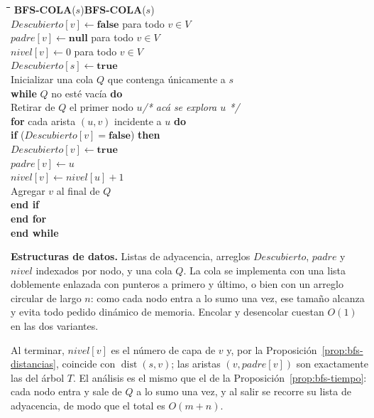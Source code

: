 \documentclass[12pt, spanish, oneside, openany]{book}
\newcommand{\pl}[1]{\makebox[1.6em][r]{\texttt{\footnotesize #1}}\hspace{0.9em}}
\newenvironment{pseudo}[1]{%
  \begin{center}%
  \begin{mdframed}[style=pseudobox]%
  \small
  \begin{tabbing}%
  \hspace{2.5em}\=\hspace{1.5em}\=\hspace{1.5em}\=\hspace{1.5em}\=\hspace{1.5em}\=\kill
  \def\pseudotitulo{#1}\ifx\pseudotitulo\empty\else#1\\[3pt]\fi}%
  {\end{tabbing}\end{mdframed}\end{center}}
\newenvironment{estructuras}%
  {\begin{center}\begin{minipage}{0.93\textwidth}\begin{mdframed}[style=estrbox]%
   \small\textbf{Estructuras de datos.}\;}%
  {\end{mdframed}\end{minipage}\end{center}}
\theoremstyle{uprightplain}
\theoremstyle{definition}
\theoremstyle{remark}
\theoremstyle{definition}
\begin{document}
\begin{pseudo}{\textbf{BFS-COLA}($s$)}
\pl{1}\> $\mathit{Descubierto}[v] \leftarrow \textbf{false}$ para todo $v\in V$\\
\pl{2}\> $\mathit{padre}[v] \leftarrow \textbf{null}$ para todo $v\in V$\\
\pl{3}\> $\mathit{nivel}[v] \leftarrow 0$ para todo $v\in V$\\
\pl{4}\> $\mathit{Descubierto}[s] \leftarrow \textbf{true}$\\
\pl{5}\> Inicializar una cola $Q$ que contenga únicamente a $s$\\
\pl{6}\> \textbf{while} $Q$ no esté vacía \textbf{do}\\
\pl{7}\>\> Retirar de $Q$ el primer nodo $u$\qquad \textit{/* acá se explora $u$ */}\\
\pl{8}\>\> \textbf{for} cada arista $(u,v)$ incidente a $u$ \textbf{do}\\
\pl{9}\>\>\> \textbf{if} ($\mathit{Descubierto}[v] = \textbf{false}$) \textbf{then}\\
\pl{10}\>\>\>\> $\mathit{Descubierto}[v] \leftarrow \textbf{true}$\\
\pl{11}\>\>\>\> $\mathit{padre}[v] \leftarrow u$\\
\pl{12}\>\>\>\> $\mathit{nivel}[v] \leftarrow \mathit{nivel}[u]+1$\\
\pl{13}\>\>\>\> Agregar $v$ al final de $Q$\\
\pl{14}\>\>\> \textbf{end if}\\
\pl{15}\>\> \textbf{end for}\\
\pl{16}\> \textbf{end while}
\end{pseudo}

\begin{estructuras}
Listas de adyacencia, arreglos $\mathit{Descubierto}$, $\mathit{padre}$
y $\mathit{nivel}$ indexados por nodo, y una cola $Q$. La cola se
implementa con una lista doblemente enlazada con punteros a primero y último, o
bien con un arreglo circular de largo $n$: como cada nodo entra a lo
sumo una vez, ese tamaño alcanza y evita todo pedido dinámico de memoria.
Encolar y desencolar cuestan $O(1)$ en las dos variantes.
\end{estructuras}


Al terminar, $\mathit{nivel}[v]$ es el número de capa de $v$ y, por la Proposición~\ref{prop:bfs-distancias}, coincide con $\operatorname{dist}(s,v)$; las aristas $(v,\mathit{padre}[v])$ son exactamente las del árbol $T$. El análisis es el mismo que el de la Proposición~\ref{prop:bfs-tiempo}: cada nodo entra y sale de $Q$ a lo sumo una vez, y al salir se recorre su lista de adyacencia, de modo que el total es $O(m+n)$.
\end{document}
